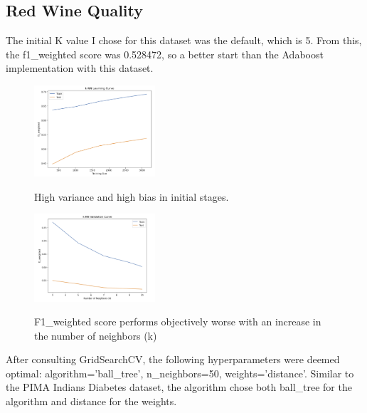 \documentclass[conference]{IEEEtran}
\begin{document}
\subsection{\textbf{Red Wine Quality}}\label{BB}

The initial K value I chose for this dataset was the default, which is 5. From this, the f1\_weighted score was 0.528472, so a better start than the Adaboost implementation with this dataset. 

\begin{figure}[H]
    \centering
    \includegraphics[width=0.40\textwidth]{Red Wine Quality Graph Images/KNN/knn lc init.png}
    \label{fig:enter-label}
    \caption{High variance and high bias in initial stages.}
\end{figure}

\begin{figure}[H]
    \centering
    \includegraphics[width=0.40\textwidth]{Red Wine Quality Graph Images/KNN/knn vc init.png}
    \label{fig:enter-label}
    \caption{F1\_weighted score performs objectively worse with an increase in the number of neighbors (k)}
\end{figure}

After consulting GridSearchCV, the following hyperparameters were deemed optimal: algorithm='ball\_tree', n\_neighbors=50, weights='distance'. Similar to the PIMA Indians Diabetes dataset, the algorithm chose both ball\_tree for the algorithm and distance for the weights. 
\end{document}
